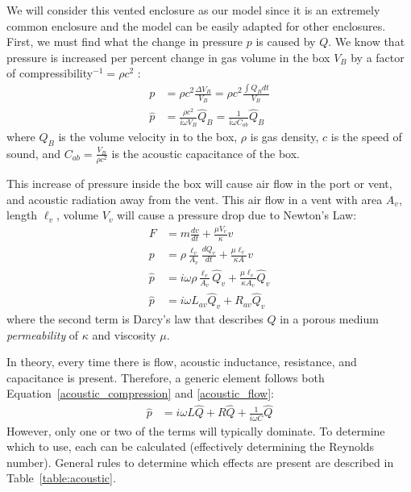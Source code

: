 \documentclass[10pt]{book}
\begin{document}
We will consider this vented enclosure as our model since it is an extremely common enclosure  and the model can be easily adapted for other enclosures. First, we must find what the change in pressure $p$ is caused by $Q$. We know that pressure is increased per percent change in gas volume in the box $V_B$ by a factor of compressibility$^{-1}=\rho c^2$ :
\begin{align}
p&=\rho c^2 \frac{\Delta V_B}{V_B}=\rho c^2 \frac{\int Q_B dt}{V_B}\\
\hat{p}&=\frac{\rho c^2}{i\omega V_B}\hat{Q}_B=\frac{1}{i\omega C_{ab}}\hat{Q}_B\label{acoustic_compression}
\end{align}
where $Q_B$ is the volume velocity in to the box, $\rho$ is gas density, $c$ is the speed of sound, and $C_{ab}=\frac{V_B}{\rho c^2}$ is the acoustic capacitance of the box.

This increase of pressure inside the box will cause air flow in 
the port or vent, and acoustic radiation away from the vent. This air flow in a vent with area $A_v$, length $\ell_v$, volume $V_v$ will cause a pressure drop due to Newton's Law:
\begin{align}
F&=m\frac{dv}{dt}+\frac{\mu V_v}{\kappa} v\\
p&=\rho \frac{\ell_v}{A_v}\frac{dQ_v}{dt}+\frac{\mu \ell_v}{\kappa A} v\\
\hat{p}&=i\omega\rho \frac{\ell_v}{A_v}\hat{Q}_v+\frac{\mu \ell_v}{\kappa A_v} \hat{Q}_v\\
\hat{p}&=i\omega L_{av} \hat{Q}_v+R_{av} \hat{Q}_v \label{acoustic_flow}
\end{align}
where the second term is Darcy's law that describes $Q$ in a porous medium \textit{permeability} of $\kappa$ and viscosity $\mu$.

In theory, every time there is flow, acoustic inductance, resistance, and capacitance is present. Therefore, a generic element follows both Equation~\ref{acoustic_compression} and \ref{acoustic_flow}:
\begin{align}
\hat{p}&=i\omega L \hat{Q}+R \hat{Q} +\frac{1}{i\omega C}\hat{Q}
\end{align}
However, only one or two of the terms will typically dominate. To determine which to use, each can be calculated (effectively determining the Reynolds number). General rules to determine which effects are present are described in Table~\ref{table:acoustic}.
\end{document}
